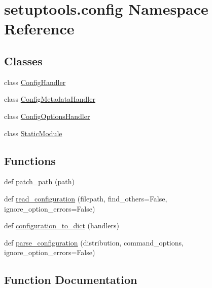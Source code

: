 \hypertarget{namespacesetuptools_1_1config}{}\section{setuptools.\+config Namespace Reference}
\label{namespacesetuptools_1_1config}
\subsection*{Classes}
\begin{DoxyCompactItemize}
\item 
class \hyperlink{classsetuptools_1_1config_1_1ConfigHandler}{Config\+Handler}
\item 
class \hyperlink{classsetuptools_1_1config_1_1ConfigMetadataHandler}{Config\+Metadata\+Handler}
\item 
class \hyperlink{classsetuptools_1_1config_1_1ConfigOptionsHandler}{Config\+Options\+Handler}
\item 
class \hyperlink{classsetuptools_1_1config_1_1StaticModule}{Static\+Module}
\end{DoxyCompactItemize}
\subsection*{Functions}
\begin{DoxyCompactItemize}
\item 
def \hyperlink{namespacesetuptools_1_1config_ab0debe927cfd8e85227b203ca09c60b8}{patch\+\_\+path} (path)
\item 
def \hyperlink{namespacesetuptools_1_1config_a2cadac39b3e9811ccf02204b63586fc9}{read\+\_\+configuration} (filepath, find\+\_\+others=False, ignore\+\_\+option\+\_\+errors=False)
\item 
def \hyperlink{namespacesetuptools_1_1config_a0e9032aade7fdb7c979274ed8f89ba3d}{configuration\+\_\+to\+\_\+dict} (handlers)
\item 
def \hyperlink{namespacesetuptools_1_1config_a2c2e6e2aaa466506a52dec243e695eb6}{parse\+\_\+configuration} (distribution, command\+\_\+options, ignore\+\_\+option\+\_\+errors=False)
\end{DoxyCompactItemize}


\subsection{Function Documentation}
\mbox{\label{namespacesetuptools_1_1config_a0e9032aade7fdb7c979274ed8f89ba3d}} 
